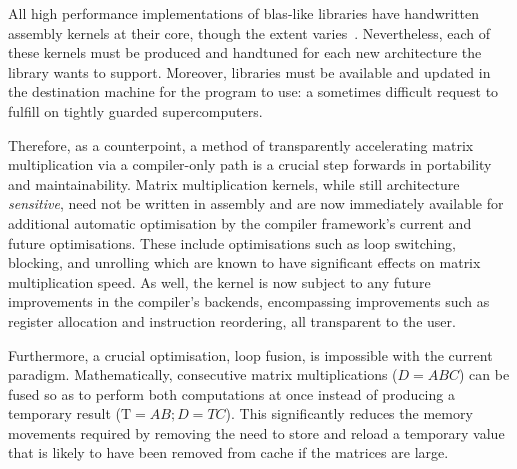 \documentclass[\main/thesis.tex]{subfiles}
\begin{document}
All high performance implementations of \gls{blas}-like libraries have handwritten assembly kernels at their core, though the extent varies~\autocite{zee2016blis}.
Nevertheless, each of these kernels must be produced and handtuned for each new architecture the library wants to support.
Moreover, libraries must be available and updated in the destination machine for the program to use: a sometimes difficult request to fulfill on tightly guarded supercomputers.

Therefore, as a counterpoint, a method of transparently accelerating matrix multiplication via a compiler-only path is a crucial step forwards in portability and maintainability.
Matrix multiplication kernels, while still architecture \emph{sensitive}\footnotemark, need not be written in assembly and are now immediately available for additional automatic optimisation by the compiler framework's current and future optimisations.
These include optimisations such as loop switching, blocking, and unrolling which are known to have significant effects on matrix multiplication speed.
As well, the kernel is now subject to any future improvements in the compiler's backends, encompassing improvements such as register allocation and instruction reordering, all transparent to the user.

Furthermore, a crucial optimisation, loop fusion, is impossible with the current paradigm.
Mathematically, consecutive matrix multiplications (\eg $D = ABC$) can be fused so as to perform both computations at once instead of producing a temporary result (\ie $\text{T}=AB;D=TC$).
This significantly reduces the memory movements required by removing the need to store and reload a temporary value that is likely to have been removed from cache if the matrices are large.

\end{document}
